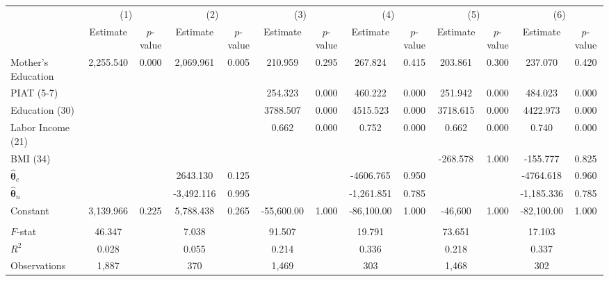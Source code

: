 \begin{tabular}{lcccccccccccc} \toprule
 & \multicolumn{2}{c}{(1)}  &  \multicolumn{2}{c}{(2)}  &  \multicolumn{2}{c}{(3)}  &  \multicolumn{2}{c}{(4)}  & \multicolumn{2}{c}{(5)} & \multicolumn{2}{c}{(6)} \\  
 & Estimate & $p$-value & Estimate & $p$-value & Estimate & $p$-value & Estimate & $p$-value & Estimate & $p$-value & Estimate & $p$-value \\ \midrule
Mother's Education &  2,255.540 &     0.000 &  2,069.961 &     0.005 &   210.959 &     0.295 &   267.824 &     0.415 &   203.861 &     0.300 &   237.070 &     0.420 \\  
PIAT (5-7) &         &         &         &         &   254.323 &     0.000 &   460.222 &     0.000 &   251.942 &     0.000 &   484.023 &     0.000 \\  
Education (30) &         &         &         &         &  3788.507 &     0.000 &  4515.523 &     0.000 &  3718.615 &     0.000 &  4422.973 &     0.000 \\  
Labor Income (21) &         &         &         &         &     0.662 &     0.000 &     0.752 &     0.000 &     0.662 &     0.000 &     0.740 &     0.000 \\  
BMI (34) &         &         &         &         &         &         &         &         &  -268.578 &     1.000 &  -155.777 &     0.825 \\  
$\hat{\bm{\theta}}_c$ &         &         &  2643.130 &     0.125 &         &         & -4606.765 &     0.950 &         &         & -4764.618 &     0.960 \\  
$\hat{\bm{\theta}}_n$ &         &         & -3,492.116 &     0.995 &         &         & -1,261.851 &     0.785 &         &         & -1,185.336 &     0.785 \\  
Constant &  3,139.966 &     0.225 &  5,788.438 &     0.265 & -55,600.00 &     1.000 & -86,100.00 &     1.000 & -46,600 &     1.000 & -82,100.00 &     1.000 \\  \\ \midrule
$F$-stat &    46.347 &     &     7.038 &     &    91.507 &    &    19.791 &     &    73.651 &     &    17.103 &   \\  
$R^2$ &     0.028 &    &     0.055 &      &     0.214 &  &     0.336 &     &     0.218 &    &     0.337 &     \\  
Observations &  1,887 &     &   370 &   &  1,469 &      &   303 &   &  1,468 &   &   302 &     \\  
\bottomrule \end{tabular}
